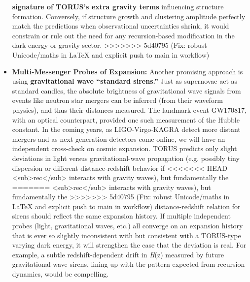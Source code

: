 \documentclass[]{article}
\begin{document}
\begin{itemize}
  \textbf{signature of TORUS's extra gravity terms} influencing
  structure formation​. Conversely, if structure growth and clustering
  amplitude perfectly match the \LambdaCDM predictions when observational
  uncertainties shrink, it would constrain or rule out the need for any
  recursion-based modification in the dark energy or gravity sector.
>>>>>>> 5d40795 (Fix: robust Unicode/maths in LaTeX and explicit push to main in workflow)
\item
  \textbf{Multi-Messenger Probes of Expansion:} Another promising
  approach is using \textbf{gravitational wave ``standard sirens.''}
  Just as supernovae act as standard candles, the absolute brightness of
  gravitational wave signals from events like neutron star mergers can
  be inferred (from their waveform physics), and thus their distances
  measured. The landmark event GW170817, with an optical counterpart,
  provided one such measurement of the Hubble constant. In the coming
  years, as LIGO-Virgo-KAGRA detect more distant mergers and as
  next-generation detectors come online, we will have an independent
  cross-check on cosmic expansion. TORUS predicts only slight deviations
  in light versus gravitational-wave propagation (e.g. possibly tiny
  dispersion or different distance-redshift behavior if
<<<<<<< HEAD
  \emph{\Lambda}\textless sub\textgreater rec\textless/sub\textgreater{}
  interacts with gravity waves\hspace{0pt}), but fundamentally the
=======
  \emph{\Lambda}\textless{}sub\textgreater{}rec\textless{}/sub\textgreater{}
  interacts with gravity waves​), but fundamentally the
>>>>>>> 5d40795 (Fix: robust Unicode/maths in LaTeX and explicit push to main in workflow)
  distance-redshift relation for sirens should reflect the same
  expansion history. If multiple independent probes (light,
  gravitational waves, etc.) all converge on an expansion history that
  is ever so slightly inconsistent with \LambdaCDM but consistent with a
  TORUS-type varying dark energy, it will strengthen the case that the
  deviation is real. For example, a subtle redshift-dependent drift in
  \emph{H}(z) measured by future gravitational-wave sirens, lining up
  with the pattern expected from recursion dynamics, would be
  compelling.
\end{itemize}
\end{document}

